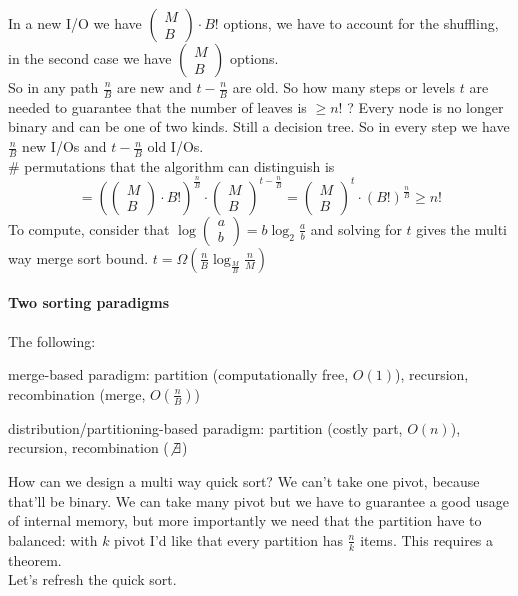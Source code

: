 \documentclass[10pt]{report}
\begin{document}
In a new I/O we have $\left(\begin{array}{c}
M\\B
\end{array}\right)\cdot B!$ options, we have to account for the shuffling, in the second case we have $\left(\begin{array}{c}
M\\B
\end{array}\right)$ options.\\
So in any path $\frac{n}{B}$ are new and $t - \frac{n}{B}$ are old. So how many steps or levels $t$ are needed to guarantee that the number of leaves is $\geq n!$ ? Every node is no longer binary and can be one of two kinds. Still a decision tree. So in every step we have $\frac{n}{B}$ new I/Os and $t - \frac{n}{B}$ old I/Os.\\
\# permutations that the algorithm can distinguish is $$= \left( \left(\begin{array}{c}
M\\B
\end{array}\right)\cdot B!\right)^{\frac{n}{B}}\cdot \left(\begin{array}{c}
M\\B
\end{array}\right)^{t - \frac{n}{B}} = \left(\begin{array}{c}
M\\B
\end{array}\right)^{t}\cdot \left(B!\right)^{\frac{n}{B}} \geq n!$$
To compute, consider that $\log\left(\begin{array}{c}
a\\b
\end{array}\right) = b\log_2 \frac{a}{b}$ and solving for $t$ gives the multi way merge sort bound. $t = \Omega(\frac{n}{B}\log_{\frac{M}{B}} \frac{n}{M})$
\paragraph{Two sorting paradigms} The following:
\begin{list}{}{}
	\item merge-based paradigm: partition (computationally free, $O(1)$), recursion, recombination (merge, $O(\frac{n}{B})$)
	\item distribution/partitioning-based paradigm: partition (costly part, $O(n)$), recursion, recombination ($\not\exists$)
\end{list}
How can we design a multi way quick sort? We can't take one pivot, because that'll be binary. We can take many pivot but we have to guarantee a good usage of internal memory, but more importantly we need that the partition have to balanced: with $k$ pivot I'd like that every partition has $\frac{n}{k}$ items. This requires a theorem.\\
Let's refresh the quick sort. %
\end{document}
